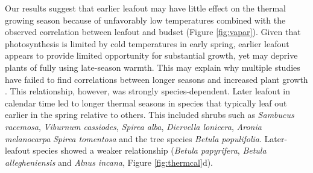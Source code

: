 \documentclass{article}[12pt]
\begin{document}
Our results suggest that earlier leafout may have little effect on the thermal growing season because of unfavorably low temperatures combined with the observed correlation between leafout and budset (Figure \ref{fig:vapar}). Given that photosynthesis is limited by cold temperatures in early spring, earlier leafout appears to provide limited opportunity for substantial growth, yet may deprive plants of fully using late-season warmth. This may explain why multiple studies have failed to find correlations between longer seasons and increased plant growth \citep{cufar2015variations,camarero2022decoupled,dow2022warm,silvestro2023longer}. %
This relationship, however, was strongly species-dependent. Later leafout in calendar time led to longer thermal seasons in species that typically leaf out earlier in the spring relative to others. This included shrubs such as \emph{Sambucus racemosa}, \emph{Viburnum cassiodes}, \emph{Spirea alba}, \emph{Diervella lonicera}, \emph{Aronia melanocarpa} \emph{Spirea tomentosa} and the tree species \emph{Betula populifolia}. Later-leafout species showed a weaker relationship (\emph{Betula papyrifera}, \emph{Betula allegheniensis} and \emph{Alnus incana}, Figure \ref{fig:thermcal}d). 
\end{document}
